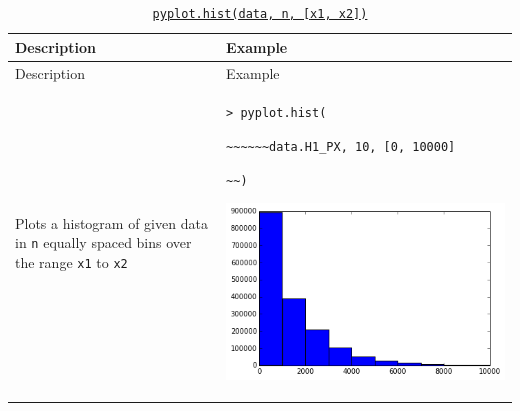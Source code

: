 \documentclass[10pt,a4paperpaper,]{article}
\begin{document}
\begin{longtable}[]{@{}ll@{}}
\caption{\href{http://matplotlib.org/api/pyplot_api.html\#matplotlib.pyplot.hist}{\texttt{pyplot.hist(data,\ n,\ {[}x1,\ x2{]})}}}\tabularnewline
\toprule
\begin{minipage}[b]{0.47\columnwidth}\raggedright\strut
Description
\strut\end{minipage} &
\begin{minipage}[b]{0.47\columnwidth}\raggedright\strut
Example
\strut\end{minipage}\tabularnewline
\midrule
\endfirsthead
\toprule
\begin{minipage}[b]{0.47\columnwidth}\raggedright\strut
Description
\strut\end{minipage} &
\begin{minipage}[b]{0.47\columnwidth}\raggedright\strut
Example
\strut\end{minipage}\tabularnewline
\midrule
\endhead
\begin{minipage}[t]{0.47\columnwidth}\raggedright\strut
Plots a histogram of given data in \texttt{n} equally spaced bins over
the range \texttt{x1} to \texttt{x2}
\strut\end{minipage} &
\begin{minipage}[t]{0.47\columnwidth}\raggedright\strut
\texttt{\textgreater{}\ pyplot.hist(}

\texttt{\textasciitilde{}\textasciitilde{}\textasciitilde{}\textasciitilde{}\textasciitilde{}\textasciitilde{}data.H1\_PX,\ 10,\ {[}0,\ 10000{]}}

\texttt{\textasciitilde{}\textasciitilde{})}

\includegraphics[width=\textwidth]{assets/01-hist.png}
\strut\end{minipage}\tabularnewline
\bottomrule
\end{longtable}
\end{document}

